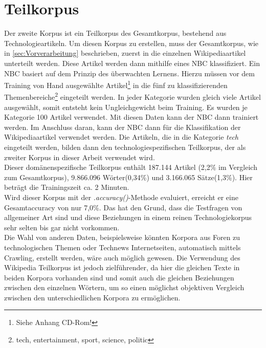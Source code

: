 \documentclass[12pt,a4paper]{report}
\begin{document}
	\section{Teilkorpus}
	\label{sec:Teilkorpus}	
	Der zweite Korpus ist ein Teilkorpus des Gesamtkorpus, bestehend aus Technologieartikeln. Um diesen Korpus zu erstellen, muss der Gesamtkorpus, wie in \ref{sec:Vorverarbeitung} beschrieben, zuerst in die einzelnen Wikipediaartikel unterteilt werden. Diese Artikel werden dann mithilfe eines NBC klassifiziert. Ein NBC basiert auf dem Prinzip des überwachten Lernens. Hierzu müssen vor dem Training von Hand ausgewählte Artikel\footnote{Siehe Anhang CD-Rom!} in die fünf zu klassifizierenden Themenbereiche\footnote{tech, entertainment, sport, science, politic} eingeteilt werden. In jeder Kategorie wurden gleich viele Artikel ausgewählt, somit entsteht kein Ungleichgewicht beim Training. Es wurden je Kategorie 100 Artikel verwendet. Mit diesen Daten kann der NBC dann trainiert werden. Im Anschluss daran, kann der NBC dann für die Klassifikation der Wikipediaartikel verwendet werden. Die Artikeln, die in die Kategorie \textit{tech} eingeteilt werden, bilden dann den technologiespezifischen Teilkorpus, der als zweiter Korpus in dieser Arbeit verwendet wird.\\
	
	
	Dieser domänenspezifische Teilkorpus enthält 187.144 Artikel (2,2\% im Vergleich zum Gesamtkorpus), 9.866.096 Wörter(0,34\%) und 3.166.065 Sätze(1,3\%). Hier beträgt die Trainingszeit ca. 2 Minuten.\\
	Wird dieser Korpus mit der \textit{.accuracy()}-Methode evaluiert, erreicht er eine Gesamtaccuracy von nur 7,0\%. Das hat den Grund, dass die Testfragen von allgemeiner Art sind und diese Beziehungen in einem reinen Technologiekorpus sehr selten bis gar nicht vorkommen.\\
	

	Die Wahl von anderen Daten, beispielsweise könnten Korpora aus Foren zu technologischen Themen oder Technews Internetseiten, automatisch mittels Crawling, erstellt werden, wäre auch möglich gewesen. Die Verwendung des Wikipedia Teilkorpus ist jedoch zielführender, da hier die gleichen Texte in beiden Korpora vorhanden sind und somit auch die gleichen Beziehungen zwischen den einzelnen Wörtern, um so einen möglichst objektiven Vergleich zwischen den unterschiedlichen Korpora zu ermöglichen.\\
	
	
\end{document}
